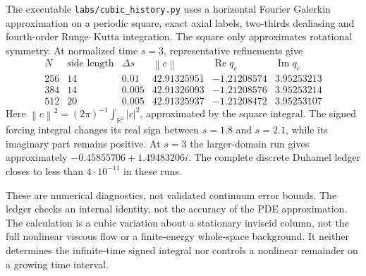 \documentclass[11pt]{article}
\theoremstyle{remark}
\newcommand{\R}{\mathbb R}
\newcommand{\norm}[1]{\left\lVert#1\right\rVert}
\begin{document}
The executable \texttt{labs/cubic\_history.py} uses a horizontal
Fourier Galerkin approximation on a periodic square, exact axial
labels, two-thirds dealiasing and fourth-order Runge--Kutta integration.
The square only approximates rotational symmetry. At normalized time
$s=3$, representative refinements give
\[
\begin{array}{c|c|c|r|r|r}
 N&\text{side length}&\Delta s&\norm c&\operatorname{Re}q_c&
                                      \operatorname{Im}q_c\\ \hline
 256&14&0.01 &42.91325951&-1.21208574&3.95253213\\
 384&14&0.005&42.91326093&-1.21208576&3.95253214\\
 512&20&0.005&42.91325937&-1.21208472&3.95253107
\end{array}
\]
Here $\norm c^2=(2\pi)^{-1}\int_{\R^2}|c|^2$, approximated by the
square integral. The signed forcing integral changes its real sign
between $s=1.8$ and $s=2.1$, while its imaginary part remains positive.
At $s=3$ the larger-domain run gives approximately
$-0.45855706+1.49483206i$. The complete discrete Duhamel ledger closes
to less than $4\cdot10^{-11}$ in these runs.

These are numerical diagnostics, not validated continuum error bounds.
The ledger checks an internal identity, not the accuracy of the PDE
approximation. The calculation is a cubic variation about a stationary
inviscid column, not the full nonlinear viscous flow or a finite-energy
whole-space background. It neither determines the infinite-time signed
integral nor controls a nonlinear remainder on a growing time interval.
\end{document}
